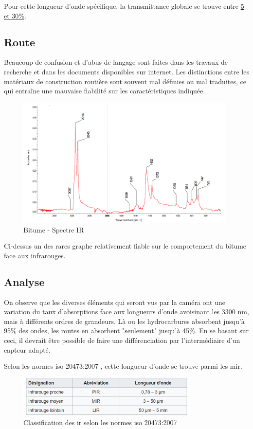 Pour cette longueur d'onde spécifique, la transmittance globale se trouve entre \underline{5 et 30\%}.

\subsection{Route}
Beaucoup de confusion et d'abus de langage sont faites dans les travaux de recherche et dans les documents disponibles sur internet.
Les distinctions entre les matériaux de construction routière sont souvent mal définies ou mal traduites, ce qui entraîne une mauvaise
fiabilité sur les caractéristiques indiquée.
\begin{figure}[H]
    \centering
    \includegraphics[width=11cm]{assets/figures/bitumeIR.png}
    \caption{Bitume - Spectre IR \cite{Bitume}}
\end{figure}
Ci-dessus un des rares graphe relativement fiable sur le comportement du bitume face aux infrarouges.
\subsection{Analyse}
On observe que les diverses éléments qui seront vus par la caméra ont une variation du taux d'absorptions face aux longueurs d'onde avoisinant les
3300 \si{\nano\metre}, mais à différents ordres de grandeurs. Là ou les hydrocarbures absorbent jusqu'à 95\% des ondes, les routes en absorbent "seulement" jusqu'à 45\%.
En se basant sur ceci, il devrait être possible de faire une différenciation par l'intermédiaire d'un capteur adapté.


Selon les normes \Gls{iso} 20473:2007 \cite{ISO}, cette longueur d'onde se trouve parmi les \Gls{mir}.
\begin{figure}[H]
    \centering
    \includegraphics[width=9cm]{assets/figures/gamme_infra.png}
    \caption{Classification des \Gls{ir} selon les normes \Gls{iso} 20473:2007 \cite{ISO}}
\end{figure}

